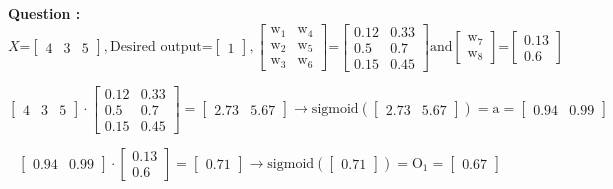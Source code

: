\begin{list}{
\textbf{Question :}~}{}
$$X \texttt{=}
\left[\begin{smallmatrix}
4 & 3 & 5
\end{smallmatrix}\right]
, 
\text{Desired output}
\texttt{=}
\left[\begin{smallmatrix}
1
\end{smallmatrix}\right]
, 
\left[\begin{smallmatrix}
\text{w}_1 & \text{w}_4\\
\text{w}_2 & \text{w}_5 \\
\text{w}_3 & \text{w}_6
\end{smallmatrix}\right]
\texttt{=}
\left[\begin{smallmatrix}
0.12 & 0.33\\
0.5 & 0.7 \\
0.15 & 0.45
\end{smallmatrix}\right]
\text{and}
\left[\begin{smallmatrix}
\text{w}_7 \\
\text{w}_8
\end{smallmatrix}\right]
\texttt{=}
\left[\begin{smallmatrix}
0.13 \\
0.6
\end{smallmatrix}\right]
$$

$$\left[\begin{smallmatrix}
4 & 3 & 5
\end{smallmatrix}\right]
\cdot 
\left[\begin{smallmatrix}
0.12 & 0.33\\
0.5 & 0.7 \\
0.15 & 0.45
\end{smallmatrix}\right]
=
\left[\begin{smallmatrix}
2.73 & 5.67 
\end{smallmatrix}\right]
\rightarrow
\text{sigmoid}(\left[\begin{smallmatrix}
2.73 & 5.67 
\end{smallmatrix}\right])
=
\text{a}
=
\left[\begin{smallmatrix}
0.94 & 0.99 
\end{smallmatrix}\right]
$$

$$\left[\begin{smallmatrix}
0.94 & 0.99 
\end{smallmatrix}\right]
\cdot 
\left[\begin{smallmatrix}
0.13\\
0.6 
\end{smallmatrix}\right]
=
\left[\begin{smallmatrix}
0.71
\end{smallmatrix}\right]
\rightarrow
\text{sigmoid}(\left[\begin{smallmatrix}
0.71
\end{smallmatrix}\right])
=
\text{O}_1
= 
\left[\begin{smallmatrix}
0.67
\end{smallmatrix}\right]
$$


\end{list}
